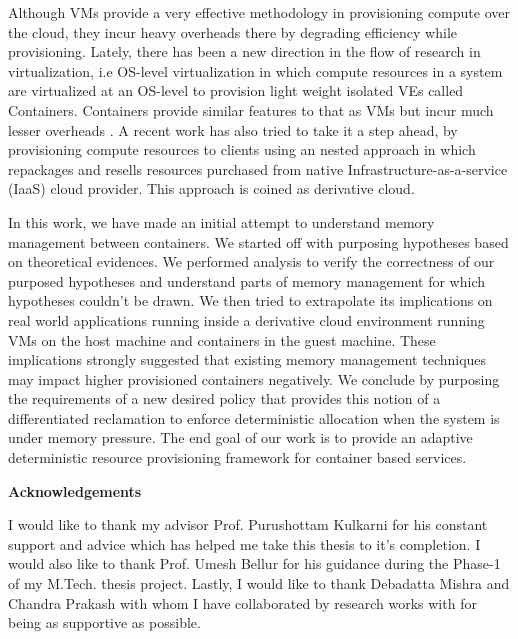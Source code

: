 \documentclass[11pt,a4paper]{report}
\begin{document}
    Although VMs provide a very effective methodology in provisioning compute over the cloud, they incur heavy overheads there by degrading 
efficiency while provisioning. Lately, there has been a new direction in the flow of research in virtualization, i.e OS-level virtualization 
in which compute resources in a system are virtualized at an OS-level to provision light weight isolated VEs called Containers. Containers 
provide similar features to that as VMs but incur much lesser overheads \cite{felter2015updated} \cite{morabito2015hypervisors} . A recent 
work \cite{sharma2015spotcheck} has also tried to take it a step ahead, by provisioning compute resources to clients using an nested 
approach in which repackages and resells resources purchased from native Infrastructure-as-a-service (IaaS) cloud provider. This approach is 
coined as derivative cloud.

    In this work, we have made an initial attempt to understand memory management between containers. We started off with purposing 
hypotheses based on theoretical evidences. We performed analysis to verify the correctness of our purposed hypotheses and understand parts 
of memory management for which hypotheses couldn't be drawn. We then tried to extrapolate its implications on real world applications 
running inside a derivative cloud environment running VMs on the host machine and containers in the guest machine. These implications 
strongly suggested that existing memory management techniques may impact higher provisioned containers negatively. We conclude by purposing 
the requirements of a new desired policy that provides this notion of a differentiated reclamation to enforce deterministic allocation when 
the system is under memory pressure. The end goal of our work is to provide an adaptive deterministic resource provisioning framework for 
container based services. 
    
    \newpage
    \begin{center}
      \huge \textbf{Acknowledgements}
    \end{center}
    \vspace*{3em}
    \normalsize 
    
    I would like to thank my advisor Prof. Purushottam Kulkarni for his constant support and advice which has helped me take 
    this thesis to it’s completion. I would also like to thank Prof. Umesh Bellur for his guidance during the Phase-1 of my 
    M.Tech. thesis project. Lastly, I would like to thank Debadatta Mishra and Chandra Prakash with whom I have collaborated by 
    research works with for being as supportive as possible.
    
\end{document}
